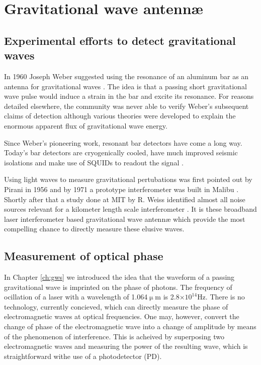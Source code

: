 \chapter{Gravitational wave antenn\ae{}}

\section{Experimental efforts to detect gravitational waves}
In 1960 Joseph Weber suggested using the resonance of an aluminum bar as an antenna for gravitational waves \cite{bar1}. %
The idea is that a passing short gravitational
wave pulse would induce a strain in the bar and excite its resonance. %
For reasons detailed elsewhere\cite{bar2,bar3}, the community was never able to verify Weber’s subsequent claims of detection\cite{bar4} although various theories\cite{bar5,bar6} were developed to explain the enormous apparent flux of gravitational wave energy.

Since Weber’s pioneering work, resonant bar detectors have come a long way. %
Today’s bar detectors are cryogenically cooled, have much improved seismic isolations and make use of SQUIDs to readout the signal \cite{bar7}.

Using light waves to measure gravitational pertubations was first pointed out by Pirani in 1956 \cite{ifo1} and by 1971 a prototype interferometer was built in Malibu \cite{ifo2}. %
Shortly after that a study done at MIT by R. %
Weiss identified almost all noise sources relevant for a kilometer length scale interferometer \cite{ifo3}. %
It is these broadband laser interferometer based gravitational wave antenn\ae{} which provide the most compelling chance to directly measure these elusive waves.

\section{Measurement of optical phase}
In Chapter \ref{ch:gws} we introduced the idea that the waveform of a passing gravitational wave is imprinted on the phase of photons. %
The frequency of ocillation of a laser with a wavelength of 1.064$\upmu$m is 2.8$\times 10^{14}$Hz. %
There is no technology, currently concieved, which can directly measure the phase of electromagnetic waves at optical frequencies. %
One may, however, convert the change of phase of the electromagnetic wave into a change of amplitude by means of the phenomenon of interference. %
This is acheived by superposing two electromagnetic waves and measuring the power of the resulting wave, which is straightforward withe use of a photodetector (PD). %


